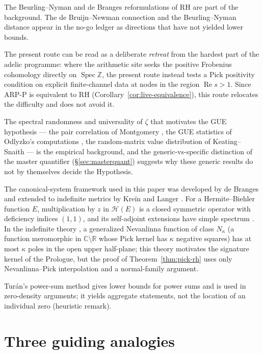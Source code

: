 \documentclass[11pt]{amsart}
\theoremstyle{definition}
\theoremstyle{remark}
\theoremstyle{definition}
\renewcommand{\Re}{\operatorname{Re}}
\newcommand{\Spec}{\operatorname{Spec}}
\newcommand{\R}{\mathbb{R}}
\newcommand{\C}{\mathbb{C}}
\begin{document}
The Beurling--Nyman and de Branges reformulations of RH \cite{Beurling,BaezDuarte,deBranges} are part of
the background. The de Bruijn--Newman connection \cite{deBruijn,Newman,RodgersTao,PolymathDBN} and the
Beurling--Nyman distance \cite{Beurling,BaezDuarte} appear in the no-go ledger as directions that have
not yielded lower bounds.

The present route can be read as a deliberate \emph{retreat} from the hardest part of the adelic programme:
where the arithmetic site seeks the positive Frobenius cohomology directly on $\Spec\mathbb Z$, the
present route instead tests a Pick positivity condition on explicit finite-channel data at nodes in the
region $\Re s>1$. Since ARP-P is equivalent to RH (Corollary~\ref{cor:live-equivalence}), this route
relocates the difficulty and does not avoid it.

The spectral randomness and universality of $\zeta$ that motivates the GUE hypothesis --- the pair
correlation of Montgomery \cite{Montgomery}, the GUE statistics of Odlyzko's computations
\cite{Odlyzko}, the random-matrix value distribution of Keating--Snaith \cite{KeatingSnaith} --- is the
empirical background, and the generic-vs-specific distinction of the master quantifier
(\S\ref{sec:masterquant}) suggests why these generic results do not by themselves decide the
Hypothesis.

The canonical-system framework used in this paper was developed by de Branges \cite{deBranges} and
extended to indefinite metrics by Kreĭn and Langer \cite{KreinLanger}. For a Hermite--Biehler function
$E$, multiplication by $z$ in $\mathcal H(E)$ is a closed symmetric operator with deficiency indices
$(1,1)$, and its self-adjoint extensions have simple spectrum \cite{deBranges}. In the indefinite theory
\cite{KreinLanger}, a generalized Nevanlinna function of class $N_\kappa$ (a function meromorphic in
$\C\setminus\R$ whose Pick kernel has $\kappa$ negative squares) has at most $\kappa$ poles in the open
upper half-plane; this theory motivates the signature kernel of the Prologue, but the proof of
Theorem~\ref{thm:pick-rh} uses only Nevanlinna--Pick interpolation and a normal-family argument.

Tur\'an's power-sum method gives lower bounds for power sums and is used in zero-density arguments;
it yields aggregate statements, not the location of an individual zero (heuristic remark).

\section{Three guiding analogies}\label{sec:analogies}
\end{document}
